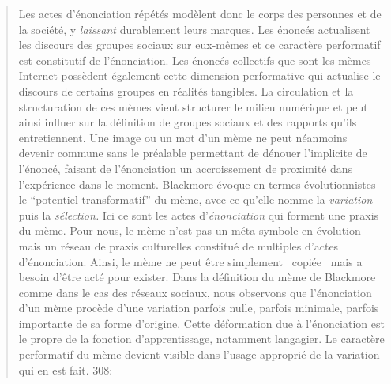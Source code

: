 \begin{quote}
Les actes d{\textquoteright}\'enonciation r\'ep\'et\'es mod\`elent donc le corps des personnes et de la soci\'et\'e, y \textit{laissant }durablement leurs marques. Les \'enonc\'es actualisent les discours des groupes sociaux sur eux-m\^emes \cite{Butler1993} et ce caract\`ere performatif est constitutif de l{\textquoteright}\'enonciation. Les \'enonc\'es collectifs que sont les m\`emes Internet poss\`edent \'egalement cette dimension performative qui actualise le discours de certains groupes en r\'ealit\'es tangibles. La circulation et la structuration de ces m\`emes vient structurer le milieu num\'erique et peut ainsi influer sur la d\'efinition de groupes sociaux et des rapports qu{\textquoteright}ils entretiennent. Une image ou un mot d{\textquoteright}un m\`eme ne peut n\'eanmoins devenir commune sans le pr\'ealable permettant de d\'enouer l{\textquoteright}implicite de l{\textquoteright}\'enonc\'e, faisant de l{\textquoteright}\'enonciation un accroissement de proximit\'e dans l{\textquoteright}exp\'erience dans le moment. Blackmore \'evoque en termes \'evolutionnistes le {\textquotedblleft}potentiel transformatif{\textquotedblright} du m\`eme, avec ce qu{\textquoteright}elle nomme la \textit{variation} puis la \textit{s\'election. }Ici ce sont les actes d{\textquoteright}\textit{\'enonciation} qui forment une praxis du m\`eme. Pour nous, le m\`eme n{\textquoteright}est pas un m\'eta-symbole en \'evolution mais un r\'eseau de praxis culturelles constitu\'e de multiples d{\textquoteright}actes d{\textquoteright}\'enonciation. Ainsi, le m\`eme ne peut \^etre simplement {\guillemotleft}~copi\'ee~{\guillemotright} mais a besoin d{\textquoteright}\^etre act\'e pour exister. Dans la d\'efinition du m\`eme de Blackmore comme dans le cas des r\'eseaux sociaux, nous observons que l{\textquoteright}\'enonciation d{\textquoteright}un m\`eme proc\`ede d{\textquoteright}une variation parfois nulle, parfois minimale, parfois importante de sa forme d{\textquoteright}origine. Cette d\'eformation due \`a l{\textquoteright}\'enonciation est le propre de la fonction d{\textquoteright}apprentissage, notamment langagier. Le caract\`ere performatif du m\`eme devient visible dans l{\textquoteright}usage appropri\'e de la variation qui en est fait. 
308: 

\end{quote}
